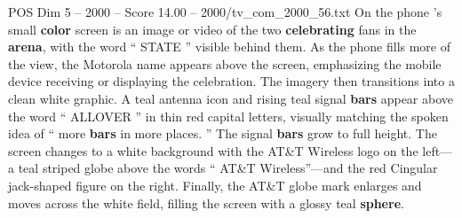 \begin{textsample}{POS Dim 5 – 2000 – Score 14.00 – 2000/tv\_com\_2000\_56.txt}
On the phone ’s small \textbf{color} screen is an image or video of the two \textbf{celebrating} fans in the \textbf{arena}, with the word “ STATE ” visible behind them.
As the phone fills more of the view, the Motorola name appears above the screen, emphasizing the mobile device receiving or displaying the celebration.
The imagery then transitions into a clean white graphic.
A teal antenna icon and rising teal signal \textbf{bars} appear above the word “ ALLOVER ” in thin red capital letters, visually matching the spoken idea of “ more \textbf{bars} in more places. ” The signal \textbf{bars} grow to full height.
The screen changes to a white background with the AT\&T Wireless logo on the left—a teal striped globe above the words “ AT\&T Wireless”—and the red Cingular jack-shaped figure on the right.
Finally, the AT\&T globe mark enlarges and moves across the white field, filling the screen with a glossy teal \textbf{sphere}.

\end{textsample}
